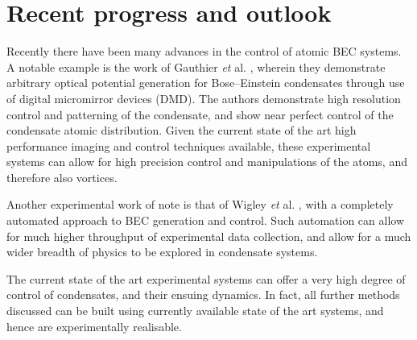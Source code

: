 \section{Recent progress and outlook}
Recently there have been many advances in the control of atomic BEC systems. A notable example is the work of Gauthier \textit{et} al. \cite{BEC:Gauthier_arxiv_2016}, wherein they demonstrate arbitrary optical potential generation for Bose--Einstein condensates through use of digital micromirror devices (DMD). The authors demonstrate high resolution control and patterning of the condensate, and show near perfect control of the condensate atomic distribution. Given the current state of the art high performance imaging and control techniques available, these experimental systems can allow for high precision control and manipulations of the atoms, and therefore also vortices.

Another experimental work of note is that of Wigley \textit{et} al. \cite{BEC:Wigley_scirep_2016}, with a completely automated approach to BEC generation and control. Such automation can allow for much higher throughput of experimental data collection, and allow for a much wider breadth of physics to be explored in condensate systems.

The current state of the art experimental systems can offer a very high degree of control of condensates, and their ensuing dynamics. In fact, all further methods discussed can be built using currently available state of the art systems, and hence are experimentally realisable.
